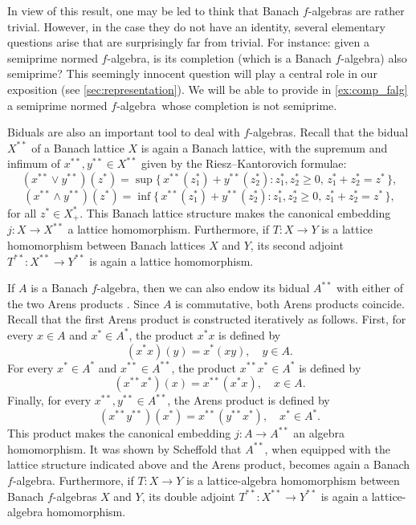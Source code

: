 \documentclass{memo-l}
\theoremstyle{definition}
\theoremstyle{remark}
\numberwithin{section}{chapter}
\numberwithin{equation}{chapter}
\newcommand{\falg}{$f\!$-algebra}
\begin{document}
In view of this result, one may be led to think that Banach \falg s
are rather trivial. However, in the case they do not have an identity, several elementary questions arise that are surprisingly far from trivial. For instance:
given a semiprime normed \falg, is its completion (which is a Banach
\falg) also semiprime? This seemingly
innocent question will play a central role in our exposition (see
\cref{sec:representation}). We will be able to provide
in \cref{ex:comp_falg} a semiprime normed \falg\ whose completion is not
semiprime.

Biduals are also an important tool to deal with \falg s. Recall
that the bidual $X^{* *}$ of a Banach lattice $X$ is again a Banach
lattice, with the supremum and infimum of $x^{* *},y^{* *} \in X^{*
*}$ given by the Riesz--Kantorovich formulae:
\[
    (x^{* *}\vee y^{* *})(z^{*})=\sup \{\, x^{* *}(z^{*}_1)+y^{*
    *}(z^{*}_2) : z^{*}_1,z^{*}_2\ge 0,\, z_1^{*}+z_2^{*}=z^{*} \, \},
\]
\[
    (x^{* *}\wedge y^{* *})(z^{*})=\inf \{\, x^{* *}(z^{*}_1)+y^{*
    *}(z^{*}_2) : z^{*}_1,z^{*}_2\ge 0,\, z_1^{*}+z_2^{*}=z^{*} \, \},
\]
for all $z^{*}\in X^{*}_+$. This Banach lattice structure makes the
canonical embedding $j\colon X\to X^{* *}$ a lattice homomorphism.
Furthermore, if $T\colon X\to Y$ is a lattice homomorphism between
Banach lattices $X$ and $Y$, its second adjoint $T^{* *}\colon X^{* *}\to
Y^{* *}$ is again a lattice homomorphism.

If $A$ is a Banach \falg, then we can also endow its bidual $A^{* *}$
with either of the two Arens products \cite{huijsmans1989}. Since $A$ is commutative, both
Arens products coincide. Recall that the first Arens product is
constructed iteratively as follows. First, for every $x \in A$ and
$x^{*}\in A^{*}$, the product $x^{*}x$ is defined by
\[
    (x^{*}x)(y)=x^{*}(xy),\quad y \in A.
\]
For every $x^{*} \in A^{*}$ and $x^{* *}\in A^{* *}$, the product
$x^{* *}x^{*} \in A^{*}$ is defined by
\[
    (x^{* *}x^{*})(x)=x^{* *}(x^{*} x),\quad x \in A.
\]
Finally, for every $x^{* *},y^{* *} \in A^{* *}$, the Arens product
is defined by
\[
    (x^{* *}y^{* *})(x^{*})=x^{* *}(y^{* *}x^{*}),\quad x^{*} \in A^{*}.
\]
This product makes the canonical embedding $j\colon A\to A^{* *}$ an
algebra homomorphism. It was shown by Scheffold \cite{scheffold1991}
that $A^{* *}$, when equipped with the lattice structure indicated
above and the Arens product, becomes again a Banach \falg.
Furthermore, if $T\colon X\to Y$ is a lattice-algebra homomorphism
between Banach \falg s $X$ and $Y$, its double adjoint $T^{* *}\colon
X^{* *}\to Y^{* *}$ is again a lattice-algebra homomorphism.
\end{document}
